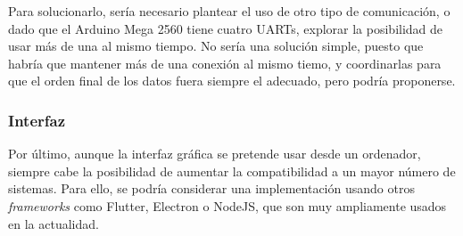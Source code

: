 Para solucionarlo, sería necesario plantear el uso de otro tipo de comunicación, o dado que el Arduino Mega 2560 tiene cuatro UARTs, explorar la posibilidad de usar más de una al mismo tiempo. No sería una solución simple, puesto que habría que mantener más de una conexión al mismo tiemo, y coordinarlas para que el orden final de los datos fuera siempre el adecuado, pero podría proponerse.

\subsubsection{Interfaz}

Por último, aunque la interfaz gráfica se pretende usar desde un ordenador, siempre cabe la posibilidad de aumentar la compatibilidad a un mayor número de sistemas. Para ello, se podría considerar una implementación usando otros \textit{frameworks} como Flutter, Electron o NodeJS, que son muy ampliamente usados en la actualidad.
